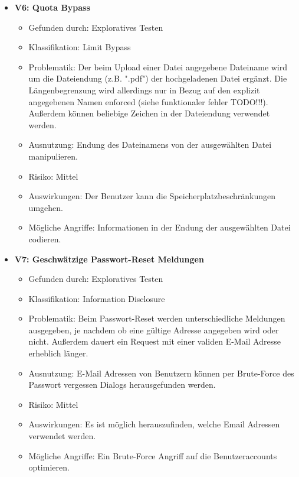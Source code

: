 \documentclass[12pt,DIV14,BCOR10mm,a4paper,parskip=half-,headsepline,headinclude,english,ngerman,bibliography=totocnumbered]{scrreprt}
\begin{document}
\begin{itemize}
  \hypertarget{vulnerability6}{}
  \item \textbf{V6: Quota Bypass}
  \begin{itemize}
    \item Gefunden durch: Exploratives Testen
  \item Klassifikation: Limit Bypass
  \item Problematik: Der beim Upload einer Datei angegebene Dateiname wird um die Dateiendung (z.B. ".pdf") der hochgeladenen Datei ergänzt. Die Längenbegrenzung wird allerdings nur in Bezug auf den explizit angegebenen Namen enforced (siehe funktionaler fehler TODO!!!). Außerdem können beliebige Zeichen in der Dateiendung verwendet werden.
  \item Ausnutzung: Endung des Dateinamens von der ausgewählten Datei manipulieren.
  \item Risiko: Mittel
  \item Auswirkungen: Der Benutzer kann die Speicherplatzbeschränkungen umgehen.
  \item Mögliche Angriffe: Informationen in der Endung der ausgewählten Datei codieren.
  \end{itemize}

  \hypertarget{vulnerability7}{}
  \item \textbf{V7: Geschwätzige Passwort-Reset Meldungen}
  \begin{itemize}
  \item Gefunden durch: Exploratives Testen
  \item Klassifikation: Information Disclosure
  \item Problematik: Beim Passwort-Reset werden unterschiedliche Meldungen ausgegeben, je nachdem ob eine gültige Adresse angegeben wird oder nicht. Außerdem dauert ein Request mit einer validen E-Mail Adresse erheblich länger.
  \item Ausnutzung: E-Mail Adressen von Benutzern können per Brute-Force des Passwort vergessen Dialogs herausgefunden werden.
  \item Risiko: Mittel
  \item Auswirkungen: Es ist möglich herauszufinden, welche Email Adressen verwendet werden.
  \item Mögliche Angriffe: Ein Brute-Force Angriff auf die Benutzeraccounts optimieren.
  \end{itemize}


\end{itemize}
\end{document}
